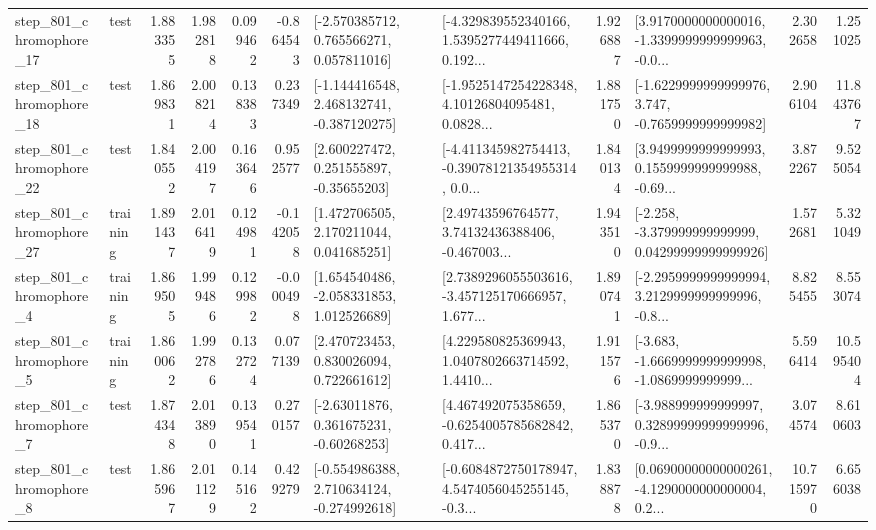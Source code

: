 \begin{tabular}{llrrrrllrlrr}
  step\_801\_chromophore\_17 &      test &      1.883355 &    1.982818 &      0.099462 & -0.864543 &    [-2.570385712, 0.765566271, 0.057811016] &  [-4.329839552340166, 1.5395277449411666, 0.192... &       1.926887 &  [3.9170000000000016, -1.3399999999999963, -0.0... &            2.302658 &          1.251025 \\
  step\_801\_chromophore\_18 &      test &      1.869831 &    2.008214 &      0.138383 &  0.237349 &   [-1.144416548, 2.468132741, -0.387120275] &  [-1.9525147254228348, 4.10126804095481, 0.0828... &       1.881750 &  [-1.6229999999999976, 3.747, -0.7659999999999982] &            2.906104 &         11.843767 \\
  step\_801\_chromophore\_22 &      test &      1.840552 &    2.004197 &      0.163646 &  0.952577 &     [2.600227472, 0.251555897, -0.35655203] &  [-4.411345982754413, -0.39078121354955314, 0.0... &       1.840134 &  [3.9499999999999993, 0.1559999999999988, -0.69... &            3.872267 &          9.525054 \\
  step\_801\_chromophore\_27 &  training &      1.891437 &    2.016419 &      0.124981 & -0.142058 &     [1.472706505, 2.170211044, 0.041685251] &  [2.49743596764577, 3.74132436388406, -0.467003... &       1.943510 &  [-2.258, -3.379999999999999, 0.04299999999999926] &            1.572681 &          5.321049 \\
   step\_801\_chromophore\_4 &  training &      1.869505 &    1.999486 &      0.129982 & -0.000498 &    [1.654540486, -2.058331853, 1.012526689] &  [2.7389296055503616, -3.457125170666957, 1.677... &       1.890741 &  [-2.2959999999999994, 3.2129999999999996, -0.8... &            8.825455 &          8.553074 \\
   step\_801\_chromophore\_5 &  training &      1.860062 &    1.992786 &      0.132724 &  0.077139 &     [2.470723453, 0.830026094, 0.722661612] &  [4.229580825369943, 1.0407802663714592, 1.4410... &       1.911576 &  [-3.683, -1.6669999999999998, -1.0869999999999... &            5.596414 &         10.595404 \\
   step\_801\_chromophore\_7 &      test &      1.874348 &    2.013890 &      0.139541 &  0.270157 &     [-2.63011876, 0.361675231, -0.60268253] &  [4.467492075358659, -0.6254005785682842, 0.417... &       1.865370 &  [-3.988999999999997, 0.32899999999999996, -0.9... &            3.074574 &          8.610603 \\
   step\_801\_chromophore\_8 &      test &      1.865967 &    2.011129 &      0.145162 &  0.429279 &   [-0.554986388, 2.710634124, -0.274992618] &  [-0.6084872750178947, 4.5474056045255145, -0.3... &       1.838878 &  [0.06900000000000261, -4.1290000000000004, 0.2... &           10.715970 &          6.656038 \\

\end{tabular}
